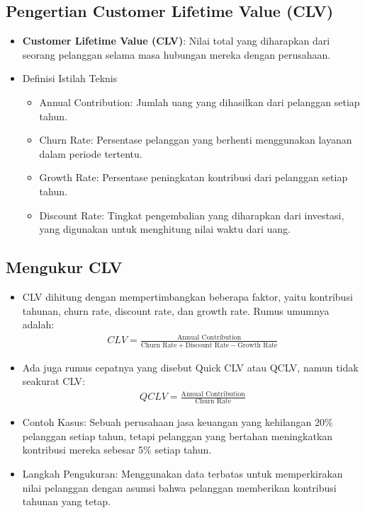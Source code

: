 \documentclass{article}
\begin{document}
\subsection{Pengertian Customer Lifetime Value (CLV)}
\begin{itemize}
    \item \textbf{Customer Lifetime Value (CLV)}: Nilai total yang diharapkan dari seorang pelanggan selama masa hubungan mereka dengan perusahaan.
    \item Definisi Istilah Teknis
          \begin{itemize}
              \item Annual Contribution: Jumlah uang yang dihasilkan dari pelanggan setiap tahun.
              \item Churn Rate: Persentase pelanggan yang berhenti menggunakan layanan dalam periode tertentu.
              \item Growth Rate: Persentase peningkatan kontribusi dari pelanggan setiap tahun.
              \item Discount Rate: Tingkat pengembalian yang diharapkan dari investasi, yang digunakan untuk menghitung nilai waktu dari uang.
          \end{itemize}
\end{itemize}

\subsection{Mengukur CLV}
\begin{itemize}
    \item CLV dihitung dengan mempertimbangkan beberapa faktor, yaitu kontribusi tahunan, churn rate, discount rate, dan growth rate. Rumus umumnya adalah:
          \begin{align*}
              CLV = \frac{\text{Annual Contribution}}{\text{Churn Rate} + \text{Discount Rate} - \text{Growth Rate}}
          \end{align*}
    \item Ada juga rumus cepatnya yang disebut Quick CLV atau QCLV, namun tidak seakurat CLV:
          \begin{align}
              QCLV = \frac{\text{Annual Contribution}}{\text{Churn Rate}}
          \end{align}
    \item Contoh Kasus: Sebuah perusahaan jasa keuangan yang kehilangan 20\% pelanggan setiap tahun, tetapi pelanggan yang bertahan meningkatkan kontribusi mereka sebesar 5\% setiap tahun.
    \item Langkah Pengukuran: Menggunakan data terbatas untuk memperkirakan nilai pelanggan dengan asumsi bahwa pelanggan memberikan kontribusi tahunan yang tetap.
\end{itemize}
\end{document}
